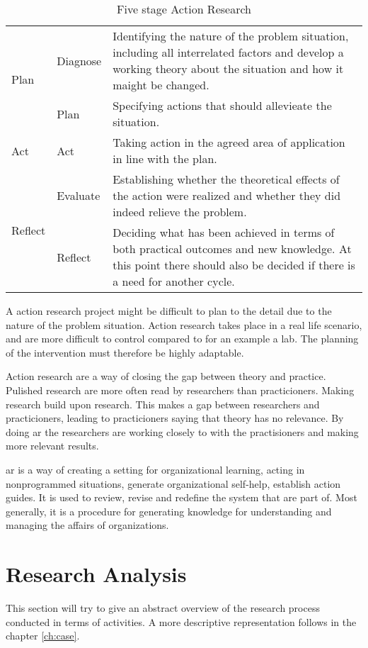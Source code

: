 \begin{table}
\begin{tabular}{m{2cm} m{2cm} m{8cm}}
\hline
\multirow{2}{*}{Plan} & Diagnose & Identifying the nature of the problem situation, including all interrelated factors and develop a working theory about the situation and how it maight be changed.\\
\cline{2-3}
 & Plan & Specifying actions that should allevieate the situation. \\
\hline
Act & Act & Taking action in the agreed area of application in line with the plan.\\
\hline
\multirow{2}{*}{Reflect} & Evaluate & Establishing whether the theoretical effects of the action were realized and whether they did indeed relieve the problem. \\
\cline{2-3}
 & Reflect &  Deciding what has been achieved in terms of both practical outcomes and new knowledge. At this point there should also be decided if there is a need for another cycle. \\
\hline
\end{tabular} 
\caption{Five stage Action Research\cite{bjo:risc}}
\label{tab:5stagear}
\end{table}
A action research project might be difficult to plan to the detail due to the nature of the problem situation. 
Action research takes place in a real life scenario, and are more difficult to control compared to for an example a lab.
The planning of the intervention must therefore be highly adaptable.


Action research are a way of closing the gap between theory and practice. 
Pulished research are more often read by researchers than practicioners. 
Making research build upon research. 
This makes a gap between researchers and practicioners, leading to practicioners saying that theory has no relevance.
By doing \gls{ar} the researchers are working closely to with the practisioners and making more relevant results. 

\gls{ar} is a way of creating a setting for organizational learning, acting in nonprogrammed situations, generate organizational self-help, establish action guides. 
It is used to review, revise and redefine the system that are part of.
Most generally, it is a procedure for generating knowledge for understanding and managing the affairs of organizations.
\cite{car:rmn}
\cite{bjo:risc}
\cite{assess:susman}

\section{Research Analysis}
This section will try to give an abstract overview of the research process conducted in terms of activities. 
A more descriptive representation follows in the chapter \ref{ch:case}.  

